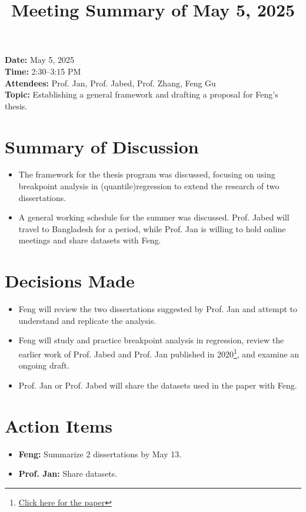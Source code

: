 \documentclass[11pt]{article}
\title{Meeting Summary of May 5, 2025}
\date{}  %
\author{}
\begin{document}
\maketitle

\noindent
\textbf{Date:} May 5, 2025 \\
\textbf{Time:} 2:30--3:15 PM \\
\textbf{Attendees:} Prof. Jan, Prof. Jabed, Prof. Zhang, Feng Gu \\
\textbf{Topic:} Establishing a general framework and drafting a proposal for Feng's thesis.

\vspace{1em}

\section*{Summary of Discussion}
\begin{itemize}[leftmargin=1.5em]
    \item The framework for the thesis program was discussed, focusing on using breakpoint analysis in (quantile)regression to extend the research of two dissertations.
    \item A general working schedule for the summer was discussed. Prof. Jabed will travel to Bangladesh for a period, while Prof. Jan is willing to hold online meetings and share datasets with Feng.
\end{itemize}

\section*{Decisions Made}
\begin{itemize}[leftmargin=1.5em]
    \item Feng will review the two dissertations suggested by Prof. Jan and attempt to understand and replicate the analysis.
    \item Feng will study and practice breakpoint analysis in regression, review the earlier work of Prof. Jabed and Prof. Jan published in 2020\footnote{\href{https://onlinelibrary.wiley.com/doi/epdf/10.1002/ece3.6955}{Click here for the paper}}, and examine an ongoing draft.
    \item Prof. Jan or Prof. Jabed will share the datasets used in the paper with Feng.
\end{itemize}

\section*{Action Items}
\begin{itemize}[leftmargin=1.5em]
    \item \textbf{Feng:} Summarize 2 dissertations by May 13.
    \item \textbf{Prof. Jan:} Share datasets.
\end{itemize}
\end{document}
